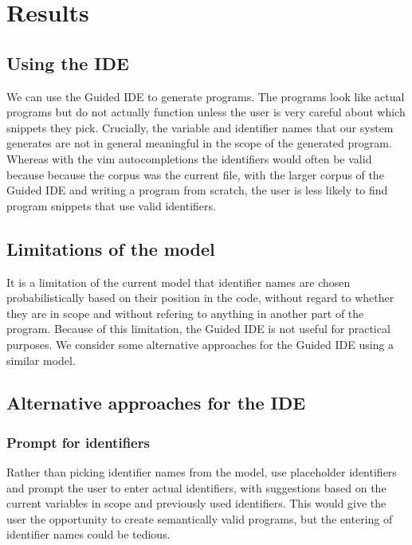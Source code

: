 \documentclass{article}
\begin{document}
\section{Results}

\subsection{Using the IDE}

We can use the Guided IDE to generate programs. The programs look like actual
programs but do not actually function unless the user is very careful about
which snippets they pick. Crucially, the variable and identifier names that our
system generates are not in general meaningful in the scope of the generated
program.  Whereas with the vim autocompletions the identifiers would often be
valid because because the corpus was the current file, with the larger corpus of
the Guided IDE and writing a program from scratch, the user is less likely to
find program snippets that use valid identifiers.

\subsection{Limitations of the model}

It is a limitation of the current model that identifier names are chosen
probabilistically based on their position in the code, without regard to whether
they are in scope and without refering to anything in another part of the
program. Because of this limitation, the Guided IDE is not useful for practical
purposes. We consider some alternative approaches for the Guided IDE using a
similar model.

\subsection{Alternative approaches for the IDE}

\subsubsection{Prompt for identifiers}

Rather than picking identifier names from the model, use placeholder identifiers
and prompt the user to enter actual identifiers, with suggestions based on the
current variables in scope and previously used identifiers. This would give the
user the opportunity to create semantically valid programs, but the entering of
identifier names could be tedious.
\end{document}
